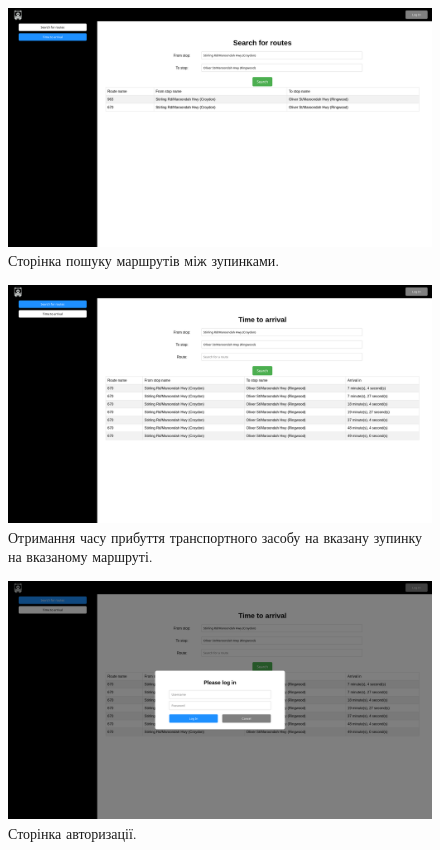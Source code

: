 \documentclass[oneside,14pt]{extarticle}
\begin{document}
\begin{figure}[H]
\centering
\includegraphics[scale=0.3]{2}
\caption{Сторінка пошуку маршрутів між зупинками.}
\end{figure}

\begin{figure}[H]
\centering
\includegraphics[scale=0.3]{3}
\caption{Отримання часу прибуття транспортного засобу на вказану зупинку на вказаному маршруті.}
\end{figure}

\begin{figure}[H]
	\centering
	\includegraphics[scale=0.3]{4}
	\caption{Сторінка авторизації.}
\end{figure}
\end{document}
